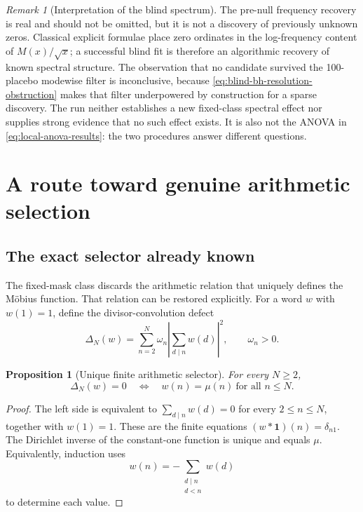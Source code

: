 \documentclass[11pt,reqno]{amsart}
\numberwithin{equation}{section}
\theoremstyle{plain}
\newtheorem{proposition}[theorem]{Proposition}
\theoremstyle{definition}
\theoremstyle{remark}
\newtheorem{remark}[theorem]{Remark}
\begin{document}
\begin{remark}[Interpretation of the blind spectrum]
\label{rem:blind-spectrum-interpretation}
The pre-null frequency recovery is real and should not be omitted, but it is
not a discovery of previously unknown zeros.  Classical explicit formulae
place zero ordinates in the log-frequency content of \(M(x)/\sqrt x\); a
successful blind fit is therefore an algorithmic recovery of known spectral
structure.  The observation that no candidate survived the 100-placebo
modewise filter is inconclusive, because
\eqref{eq:blind-bh-resolution-obstruction} makes that filter underpowered by
construction for a sparse discovery.  The run neither establishes a new
fixed-class spectral effect nor supplies strong evidence that no such effect
exists.  It is also not the ANOVA in
\eqref{eq:local-anova-results}: the two procedures answer different
questions.
\end{remark}

\section{A route toward genuine arithmetic selection}
\label{sec:selection-route}

\subsection{The exact selector already known}
\label{subsec:exact-arithmetic-selector}

The fixed-mask class discards the arithmetic relation that uniquely defines
the M\"obius function.  That relation can be restored explicitly.  For a word
\(w\) with \(w(1)=1\), define the divisor-convolution defect
\begin{equation}
\Delta_N(w)
=\sum_{n=2}^{N}\omega_n
\left|\sum_{d\mid n}w(d)\right|^2,
\qquad \omega_n>0.
\label{eq:divisor-convolution-defect}
\end{equation}

\begin{proposition}[Unique finite arithmetic selector]
\label{prop:unique-arithmetic-selector}
For every \(N\geq2\),
\begin{equation}
\Delta_N(w)=0
\quad\Longleftrightarrow\quad
w(n)=\mu(n)\ \text{for all }n\leq N.
\label{eq:unique-arithmetic-selection}
\end{equation}
\end{proposition}

\begin{proof}
The left side is equivalent to
\(\sum_{d\mid n}w(d)=0\) for every \(2\leq n\leq N\), together with
\(w(1)=1\).  These are the finite equations
\((w*\mathbf 1)(n)=\delta_{n1}\).  The Dirichlet inverse of the constant-one
function is unique and equals \(\mu\).  Equivalently, induction uses
\begin{equation}
w(n)=-\sum_{\substack{d\mid n\\d<n}}w(d)
\label{eq:mobius-recursion}
\end{equation}
to determine each value.
\end{proof}
\end{document}
